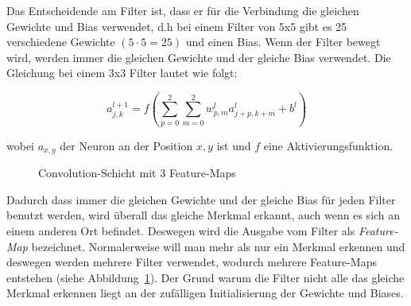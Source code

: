 \documentclass[12pt,a4paper]{report}
\begin{document}
Das Entscheidende am Filter ist, dass er für die Verbindung die gleichen Gewichte und Bias verwendet, d.h bei einem
Filter von 5x5 gibt es 25 verschiedene Gewichte $(5\cdot 5=25)$ und einen Bias.
Wenn der Filter bewegt wird, werden immer die gleichen Gewichte und der gleiche Bias verwendet.
Die Gleichung bei einem 3x3 Filter lautet wie folgt:

\[a^{l+1}_{j,k} = f\left(\sum_{p=0}^{2}\sum_{m=0}^{2}w^l_{p,m}a^l_{j+p,k+m} + b^l\right)\]

wobei $a_{x, y}$ der Neuron an der Position $x, y$ ist und $f$ eine Aktivierungsfunktion.

\begin{figure}[!h]%
    \centering
{}
    \caption{Convolution-Schicht mit 3 Feature-Maps}%
    \label{fig:conv4}
\end{figure}

Dadurch dass immer die gleichen Gewichte und der gleiche Bias für jeden Filter benutzt werden,
wird überall das gleiche Merkmal erkannt, auch wenn es sich an einem anderen Ort befindet.
Deswegen wird die Ausgabe vom Filter als \textit{Feature-Map} bezeichnet.
Normalerweise will man mehr als nur ein Merkmal erkennen und deswegen werden mehrere Filter verwendet,
wodurch mehrere Feature-Maps entstehen (siehe Abbildung~\ref{fig:conv4}).
Der Grund warum die Filter nicht alle das gleiche Merkmal erkennen liegt an der zufälligen Initialisierung der Gewichte und Biases.
\end{document}
